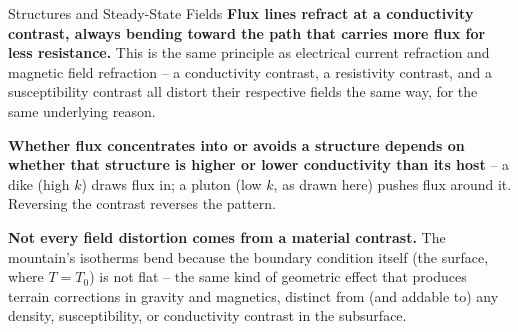 \begin{activity}{Structures and Steady-State Fields}
\textbf{Flux lines refract at a conductivity contrast, always bending toward the path that carries more flux for less resistance.} This is the same principle as electrical current refraction and magnetic field refraction -- a conductivity contrast, a resistivity contrast, and a susceptibility contrast all distort their respective fields the same way, for the same underlying reason.

\textbf{Whether flux concentrates into or avoids a structure depends on whether that structure is higher or lower conductivity than its host} -- a dike (high $k$) draws flux in; a pluton (low $k$, as drawn here) pushes flux around it. Reversing the contrast reverses the pattern.

\textbf{Not every field distortion comes from a material contrast.} The mountain's isotherms bend because the boundary condition itself (the surface, where $T=T_0$) is not flat -- the same kind of geometric effect that produces terrain corrections in gravity and magnetics, distinct from (and addable to) any density, susceptibility, or conductivity contrast in the subsurface.

\end{activity}
